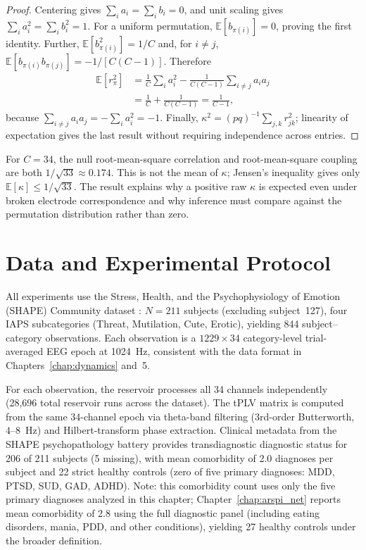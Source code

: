 \begin{proof}
Centering gives $\sum_i a_i=\sum_i b_i=0$, and unit scaling gives
$\sum_i a_i^2=\sum_i b_i^2=1$. For a uniform permutation,
$\mathbb{E}[b_{\pi(i)}]=0$, proving the first identity. Further,
$\mathbb{E}[b_{\pi(i)}^2]=1/C$ and, for $i\ne j$,
$\mathbb{E}[b_{\pi(i)}b_{\pi(j)}]=-1/[C(C-1)]$. Therefore
\begin{align}
\mathbb{E}[r_\pi^2]
&=\frac{1}{C}\sum_i a_i^2
-\frac{1}{C(C-1)}\sum_{i\ne j}a_i a_j\\
&=\frac{1}{C}+\frac{1}{C(C-1)}=\frac{1}{C-1},
\end{align}
because $\sum_{i\ne j}a_i a_j=-\sum_i a_i^2=-1$. Finally,
$\kappa^2=(pq)^{-1}\sum_{j,k}r_{jk}^2$; linearity of expectation gives the
last result without requiring independence across entries.
\end{proof}

For $C=34$, the null root-mean-square correlation and root-mean-square coupling
are both $1/\sqrt{33}\approx0.174$. This is not the mean of $\kappa$; Jensen's
inequality gives only $\mathbb{E}[\kappa]\le1/\sqrt{33}$. The result explains why
a positive raw $\kappa$ is expected even under broken electrode correspondence
and why inference must compare against the permutation distribution rather than
zero.


\section{Data and Experimental Protocol}
\label{sec:ch7_protocol}

All experiments use the Stress, Health, and the Psychophysiology of Emotion (SHAPE) Community dataset \cite{noauthor_shape_2018}: $N = 211$ subjects (excluding subject~127), four IAPS subcategories (Threat, Mutilation, Cute, Erotic), yielding 844 subject--category observations. Each observation is a $1229 \times 34$ category-level trial-averaged EEG epoch at 1024~Hz, consistent with the data format in Chapters~\ref{chap:dynamics} and~5.

For each observation, the reservoir processes all 34 channels independently (28,696 total reservoir runs across the dataset). The tPLV matrix is computed from the same 34-channel epoch via theta-band filtering (3rd-order Butterworth, $4$--$8$~Hz) and Hilbert-transform phase extraction. Clinical metadata from the SHAPE psychopathology battery provides transdiagnostic diagnostic status for 206 of 211 subjects (5 missing), with mean comorbidity of 2.0 diagnoses per subject and 22 strict healthy controls (zero of five primary diagnoses: MDD, PTSD, SUD, GAD, ADHD). Note: this comorbidity count uses only the five primary diagnoses analyzed in this chapter; Chapter~\ref{chap:arspi_net} reports mean comorbidity of 2.8 using the full diagnostic panel (including eating disorders, mania, PDD, and other conditions), yielding 27 healthy controls under the broader definition.

